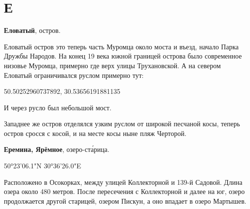 \chapter*{Е}

\textbf{Еловатый}, остров. 

Еловатый остров это теперь часть Муромца около моста и въезд, начало Парка Дружбы Народов. На конец 19 века южной границей острова было современное низовье Муромца, примерно где верх улицы Трухановской. А на севером Еловатый ограничивался руслом примерно тут:

50.50252960737892, 30.53656191881135

И через русло был небольшой мост.

Западнее же остров отделялся узким руслом от широкой песчаной косы, теперь остров сросся с косой, и на месте косы ныне пляж Черторой.\\

\medskip

\textbf{Еремина, Ярёмное}, озеро-ст\'арица. 

50°23'06.1"N 30°36'26.0"E

Расположено в Осокорках, между улицей Коллекторной и 139-й Садовой. Длина озера около 480 метров. После пересечения с Коллекторной и далее на юг, озеро продолжается другой старицей, озером Пискун, а оно впадает в озеро Мартышев.